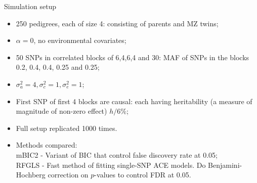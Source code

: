\documentclass[handout,10pt]{beamer}
\begin{document}
\begin{frame}{Simulation setup}
\begin{itemize}
\item 250 pedigrees, each of size 4: consisting of parents and MZ twins;
\item $\alpha = 0$, no environmental covariates;
\item 50 SNPs in correlated blocks of 6,4,6,4 and 30: MAF of SNPs in the blocks 0.2, 0.4, 0.4, 0.25 and 0.25;
\item $\sigma^2_a = 4, \sigma^2_c = 1, \sigma^2_e = 1$;
\item First SNP of first 4 blocks are causal: each having heritability (a measure of magnitude of non-zero effect) $h/6 \%$;
\item Full setup replicated 1000 times.

\vspace{1em}
\item Methods compared:\\
{\colb mBIC2} - Variant of BIC that control false discovery rate at 0.05;\\
{\colb RFGLS} - Fast method of fitting single-SNP ACE models. Do Benjamini-Hochberg correction on $p$-values to control FDR at 0.05.
\end{itemize}
\end{frame}
\end{document}

